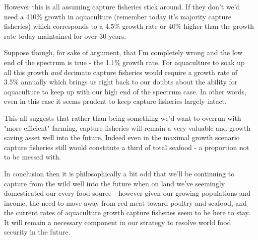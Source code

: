 \documentclass[11pt,a5paper]{book}
\begin{document}
However this is all assuming capture fisheries stick around. If they don't we'd need a 410\% growth in aquaculture (remember today it's majority capture fisheries) which corresponds to a 4.5\% growth rate or 40\% higher than the growth rate today maintained for over 30 years. 
\newline

Suppose though, for sake of argument, that I'm completely wrong and the low end of the spectrum is true - the 1.1\% growth rate. For aquaculture to soak up all this growth \textit{and} decimate capture fisheries would require a growth rate of 3.5\% annually which brings us right back to our doubts about the ability for aquaculture to keep up with our high end of the spectrum case. In other words, even in this case it seems prudent to keep capture fisheries largely intact.
\newline

This all suggests that rather than being something we'd want to overrun with "more efficient" farming, capture fisheries will remain a very valuable and growth saving asset well into the future. Indeed even in the maximal growth scenario capture fisheries still would constitute a third of total seafood - a proportion not to be messed with. 
\newline

In conclusion then it is philosophically a bit odd that we'll be continuing to capture from the wild well into the future when on land we've seemingly domesticated our every food source - however given our growing populations and income, the need to move away from red meat toward poultry and seafood, and the current rates of aquaculture growth capture fisheries seem to be here to stay. It will remain a necessary component in our strategy to resolve world food security in the future. 



\end{document}
